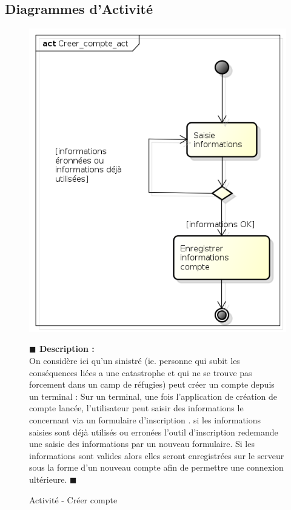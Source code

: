 \documentclass[11pt, titlepage]{report}
\newcommand{\debutDescription}{\noindent\textbf{\textcolor{DescriptionColor}{$\blacksquare$  Description : \\}}}
\newcommand{\finDescription}{\noindent\textcolor{DescriptionColor}{$\blacksquare$}}
\begin{document}
\subsection{Diagrammes d'Activité}
\begin{figure}[h!]
\begin{center}
\includegraphics[scale=.4]{../images/diagrammes/uml/complementaire/Creer_compte_act.png} 
\caption{Activité - Créer compte}
\end{center}
\debutDescription
On considère ici qu'un sinistré (ie. personne qui subit les conséquences liées a une catastrophe et qui ne se trouve pas forcement dans un camp de réfugies) peut créer un compte depuis un terminal :
Sur un terminal, une fois l'application de création de compte lancée, l'utilisateur peut saisir des informations le concernant via un formulaire d'inscription . si les informations saisies  sont déjà utilisés ou erronées l'outil d’inscription redemande une saisie des informations par un nouveau formulaire. Si les informations sont valides alors elles seront enregistrées sur le serveur sous la forme d'un nouveau compte afin de permettre une connexion ultérieure.
\finDescription
\end{figure}
\end{document}
